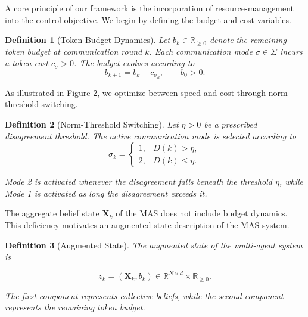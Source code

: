 \documentclass[journal,twoside,web]{ieeecolor_no_firstpage_logo}
\newtheorem{definition}{Definition}
\begin{document}
A core principle of our framework is the incorporation of resource-management into the control objective. We begin by defining the budget and cost variables. 

\begin{definition}[Token Budget Dynamics]\label{def:budget}
Let
$
b_k\in\mathbb R_{\ge0}
$
denote the remaining token budget at communication round $k$.
Each communication mode
$\sigma\in\Sigma$
incurs a token cost
$c_\sigma>0$.
The budget evolves according to
\begin{equation}
b_{k+1}
=
b_k-c_{\sigma_k},
\qquad
b_0>0.
\label{eq:budget}
\end{equation}
\end{definition}


As illustrated in Figure 2, we optimize between speed and cost through norm-threshold switching.

\begin{definition}[Norm-Threshold Switching]\label{def:switch}
Let $\eta>0$ be a prescribed disagreement threshold.
The active communication mode is selected according to
\begin{equation}
\sigma_k=
\begin{cases}
1, & D(k)>\eta,\\[2mm]
2, & D(k)\le \eta.
\end{cases}
\label{eq:rule}
\end{equation}

Mode 2 is activated whenever the disagreement falls beneath the threshold $\eta$,
while Mode 1 is activated as long the disagreement exceeds it.
\end{definition}

The aggregate belief state $\mathbf{X}_k$ of the MAS does not include budget dynamics. This deficiency motivates an augmented state description of the MAS system. 

\begin{definition}[Augmented State]
The augmented state of the multi-agent system is

\begin{equation}
z_k=(\mathbf{X}_k,b_k)
\in
\mathbb R^{N\times d}\times\mathbb R_{\ge0}.
\end{equation}

The first component represents collective beliefs,
while the second component represents the remaining token budget.
\end{definition}
\end{document}
